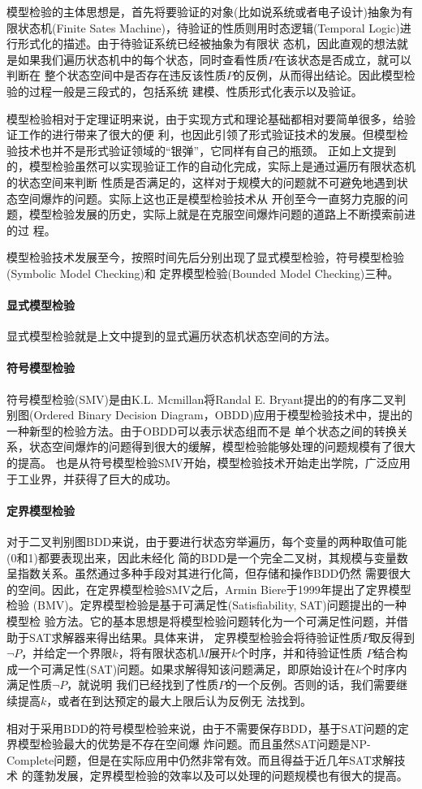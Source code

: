模型检验的主体思想是，首先将要验证的对象(比如说系统或者电子设计)抽象为有限状态机(Finite Sates
Machine)，待验证的性质则用时态逻辑(Temporal Logic)进行形式化的描述。由于待验证系统已经被抽象为有限状
态机，因此直观的想法就是如果我们遍历状态机中的每个状态，同时查看性质$P$在该状态是否成立，就可以判断在
整个状态空间中是否存在违反该性质$P$的反例，从而得出结论。因此模型检验的过程一般是三段式的，包括系统
建模、性质形式化表示以及验证。

模型检验相对于定理证明来说，由于实现方式和理论基础都相对要简单很多，给验证工作的进行带来了很大的便
利，也因此引领了形式验证技术的发展。但模型检验技术也并不是形式验证领域的``银弹''，它同样有自己的瓶颈。
正如上文提到的，模型检验虽然可以实现验证工作的自动化完成，实际上是通过遍历有限状态机的状态空间来判断
性质是否满足的，这样对于规模大的问题就不可避免地遇到状态空间爆炸的问题。实际上这也正是模型检验技术从
开创至今一直努力克服的问题，模型检验发展的历史，实际上就是在克服空间爆炸问题的道路上不断摸索前进的过
程。

模型检验技术发展至今，按照时间先后分别出现了显式模型检验，符号模型检验(Symbolic Model Checking)和
定界模型检验(Bounded Model Checking)三种。

\paragraph{显式模型检验}
显式模型检验就是上文中提到的显式遍历状态机状态空间的方法。

\paragraph{符号模型检验}
符号模型检验(SMV)是由K.L. Mcmillan将Randal E. Bryant提出的的有序二叉判别图(Ordered Binary
Decision Diagram，OBDD)应用于模型检验技术中，提出的一种新型的检验方法。由于OBDD可以表示状态组而不是
单个状态之间的转换关系，状态空间爆炸的问题得到很大的缓解，模型检验能够处理的问题规模有了很大的提高。
也是从符号模型检验SMV开始，模型检验技术开始走出学院，广泛应用于工业界，并获得了巨大的成功。

\paragraph{定界模型检验}
对于二叉判别图BDD来说，由于要进行状态穷举遍历，每个变量的两种取值可能(0和1)都要表现出来，因此未经化
简的BDD是一个完全二叉树，其规模与变量数呈指数关系。虽然通过多种手段对其进行化简，但存储和操作BDD仍然
需要很大的空间。因此，在定界模型检验SMV之后，Armin Biere于1999年提出了定界模型检验
(BMV)\cite{Biere03boundedmodel}。定界模型检验是基于可满足性(Satisfiability, SAT)问题提出的一种模型检
验方法。它的基本思想是将模型检验问题转化为一个可满足性问题，并借助于SAT求解器来得出结果。具体来讲，
定界模型检验会将待验证性质$P$取反得到$\neg P$，并给定一个界限$k$，将有限状态机$M$展开$k$个时序，并和待验证性质
$P$结合构成一个可满足性(SAT)问题。如果求解得知该问题满足，即原始设计在$k$个时序内满足性质$\neg P$，就说明
我们已经找到了性质$P$的一个反例。否则的话，我们需要继续提高$k$，或者在到达预定的最大上限后认为反例无
法找到。

相对于采用BDD的符号模型检验来说，由于不需要保存BDD，基于SAT问题的定界模型检验最大的优势是不存在空间爆
炸问题。而且虽然SAT问题是NP-Complete问题，但是在实际应用中仍然非常有效。而且得益于近几年SAT求解技术
的蓬勃发展，定界模型检验的效率以及可以处理的问题规模也有很大的提高。

